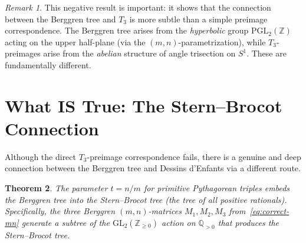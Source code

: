 \documentclass[12pt]{amsart}
\newtheorem{theorem}{Theorem}[section]
\theoremstyle{definition}
\theoremstyle{remark}
\newtheorem{remark}[theorem]{Remark}
\newcommand{\ZZ}{\mathbb{Z}}
\newcommand{\QQ}{\mathbb{Q}}
\begin{document}
\begin{remark}
This negative result is important: it shows that the connection between
the Berggren tree and $T_3$ is more subtle than a simple preimage
correspondence.  The Berggren tree arises from the \emph{hyperbolic}
group $\mathrm{PGL}_2(\ZZ)$ acting on the upper half-plane (via the
$(m,n)$-parametrization), while $T_3$-preimages arise from the
\emph{abelian} structure of angle trisection on $S^1$.  These are
fundamentally different.
\end{remark}


\section{What IS True: The Stern--Brocot Connection}\label{sec:stern-brocot}

Although the direct $T_3$-preimage correspondence fails, there is a
genuine and deep connection between the Berggren tree and Dessins d'Enfants
via a different route.

\begin{theorem}\label{thm:stern-brocot-belyi}
The parameter $t = n/m$ for primitive Pythagorean triples embeds the
Berggren tree into the Stern--Brocot tree (the tree of all positive
rationals).  Specifically, the three Berggren $(m,n)$-matrices
$M_1, M_2, M_3$ from~\eqref{eq:correct-mn} generate a subtree of
the $\mathrm{GL}_2(\ZZ_{\ge 0})$ action on $\QQ_{>0}$ that produces
the Stern--Brocot tree.
\end{theorem}
\end{document}
